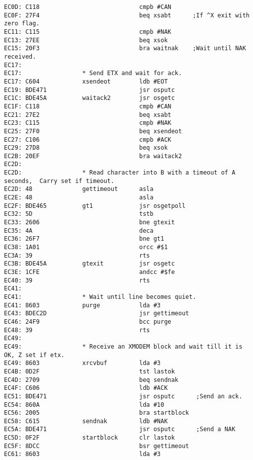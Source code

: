 {\begin{verbatim}
EC0D: C118                            cmpb #CAN
EC0F: 27F4                            beq xsabt      ;If ^X exit with zero flag.
EC11: C115                            cmpb #NAK
EC13: 27EE                            beq xsok        
EC15: 20F3                            bra waitnak    ;Wait until NAK received.
EC17:                 
EC17:                 * Send ETX and wait for ack.
EC17: C604            xsendeot        ldb #EOT
EC19: BDE471                          jsr osputc
EC1C: BDE45A          waitack2        jsr osgetc
EC1F: C118                            cmpb #CAN
EC21: 27E2                            beq xsabt
EC23: C115                            cmpb #NAK
EC25: 27F0                            beq xsendeot
EC27: C106                            cmpb #ACK
EC29: 27D8                            beq xsok
EC2B: 20EF                            bra waitack2
EC2D:                 
EC2D:                 * Read character into B with a timeout of A seconds,  Carry set if timeout.
EC2D: 48              gettimeout      asla
EC2E: 48                              asla
EC2F: BDE465          gt1             jsr osgetpoll
EC32: 5D                              tstb
EC33: 2606                            bne gtexit
EC35: 4A                              deca
EC36: 26F7                            bne gt1         
EC38: 1A01                            orcc #$1
EC3A: 39                              rts
EC3B: BDE45A          gtexit          jsr osgetc
EC3E: 1CFE                            andcc #$fe
EC40: 39                              rts
EC41:                 
EC41:                 * Wait until line becomes quiet.
EC41: 8603            purge           lda #3
EC43: BDEC2D                          jsr gettimeout
EC46: 24F9                            bcc purge
EC48: 39                              rts
EC49:                 
EC49:                 * Receive an XMODEM block and wait till it is OK, Z set if etx.                         
EC49: 8603            xrcvbuf         lda #3
EC4B: 0D2F                            tst lastok                              
EC4D: 2709                            beq sendnak
EC4F: C606                            ldb #ACK
EC51: BDE471                          jsr osputc      ;Send an ack.
EC54: 860A                            lda #10         
EC56: 2005                            bra startblock
EC58: C615            sendnak         ldb #NAK
EC5A: BDE471                          jsr osputc      ;Send a NAK
EC5D: 0F2F            startblock      clr lastok
EC5F: 8DCC                            bsr gettimeout   
EC61: 8603                            lda #3

\end{verbatim}}
